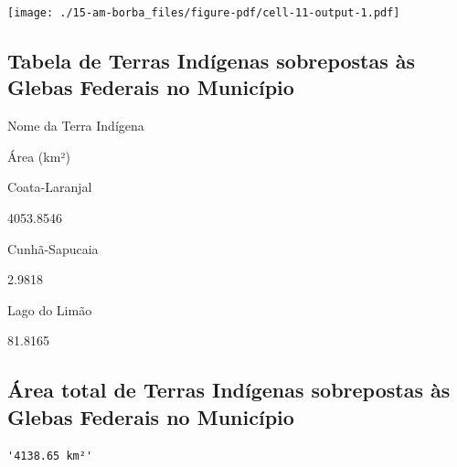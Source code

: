 \documentclass[
  letterpaper,
]{report}
\begin{document}
\texttt{[image: ./15-am-borba\_files/figure-pdf/cell-11-output-1.pdf]}

\hypertarget{tabela-de-terras-induxedgenas-sobrepostas-uxe0s-glebas-federais-no-municuxedpio-1}{%
\subsection{Tabela de Terras Indígenas sobrepostas às Glebas Federais no
Município}\label{tabela-de-terras-induxedgenas-sobrepostas-uxe0s-glebas-federais-no-municuxedpio-1}}

\n  

\n    

\n      

Nome da Terra Indígena

\n      

Área (km²)

\n    

\n  

\n  

\n    

\n      

Coata-Laranjal

\n      

4053.8546

\n    

\n    

\n      

Cunhã-Sapucaia

\n      

2.9818

\n    

\n    

\n      

Lago do Limão

\n      

81.8165

\n    

\n  

\n

\hypertarget{uxe1rea-total-de-terras-induxedgenas-sobrepostas-uxe0s-glebas-federais-no-municuxedpio-1}{%
\subsection{Área total de Terras Indígenas sobrepostas às Glebas
Federais no
Município}\label{uxe1rea-total-de-terras-induxedgenas-sobrepostas-uxe0s-glebas-federais-no-municuxedpio-1}}

\begin{verbatim}
'4138.65 km²'
\end{verbatim}
\end{document}
